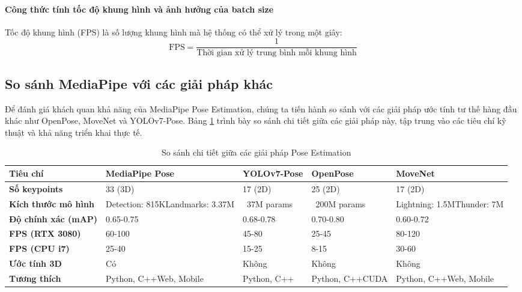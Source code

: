 \paragraph{Công thức tính tốc độ khung hình và ảnh hưởng của batch size}
Tốc độ khung hình (FPS) là số lượng khung hình mà hệ thống có thể xử lý trong một giây:
\begin{equation}
\text{FPS} = \frac{1}{\text{Thời gian xử lý trung bình mỗi khung hình}}
\end{equation}

\subsection{So sánh MediaPipe với các giải pháp khác}

Để đánh giá khách quan khả năng của MediaPipe Pose Estimation, chúng ta tiến hành so sánh với các giải pháp ước tính tư thế hàng đầu khác như OpenPose, MoveNet và YOLOv7-Pose. Bảng \ref{tab:comparison_pose_detailed} trình bày so sánh chi tiết giữa các giải pháp này, tập trung vào các tiêu chí kỹ thuật và khả năng triển khai thực tế.

\begin{table}[htbp]
\centering
\caption{So sánh chi tiết giữa các giải pháp Pose Estimation}
\label{tab:comparison_pose_detailed}
\renewcommand{\arraystretch}{1.4}
\begin{tabular}{|p{2.8cm}|p{3cm}|p{2.8cm}|p{2.8cm}|p{2.8cm}|}
\hline
\textbf{Tiêu chí} & \textbf{MediaPipe Pose} & \textbf{YOLOv7-Pose} & \textbf{OpenPose} & \textbf{MoveNet} \\
\hline
\textbf{Số keypoints} & 33 (3D) & 17 (2D) & 25 (2D) & 17 (2D) \\
\hline
\textbf{Kích thước mô hình} & Detection: 815K\newline Landmarks: 3.37M & ~37M params & ~200M params & Lightning: 1.5M\newline Thunder: 7M \\
\hline
\textbf{Độ chính xác (mAP)} & 0.65-0.75 & 0.68-0.78 & 0.70-0.80 & 0.60-0.72 \\
\hline
\textbf{FPS (RTX 3080)} & 60-100 & 45-80 & 25-45 & 80-120 \\
\hline
\textbf{FPS (CPU i7)} & 25-40 & 15-25 & 8-15 & 30-60 \\
\hline
\textbf{Ước tính 3D} & Có & Không & Không & Không \\
\hline
\textbf{Tương thích} & Python, C++\newline Web, Mobile & Python, C++ & Python, C++\newline CUDA & Python, C++\newline Web, Mobile \\
\hline
\end{tabular}
\end{table}


